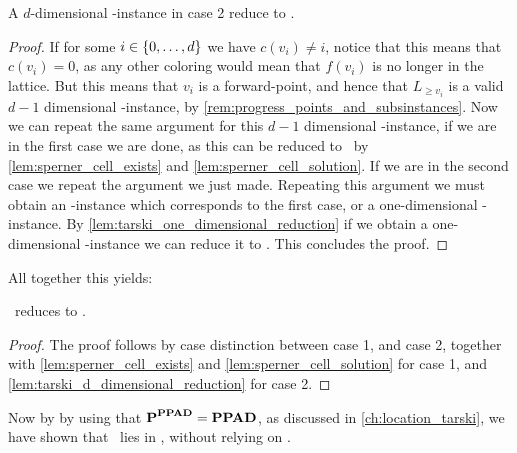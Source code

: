\begin{lemma}\label{lem:tarski_d_dimensional_reduction}
	A $d$-dimensional \Tarskistar-instance in case 2 reduce to \Sperner\@.
\end{lemma}
\begin{proof}
	If for some $i \in \left\{0, \dots, d\right\}$ we have $c(v_i) \neq i$, notice that this means that $c(v_i) = 0$, as any other coloring would mean that $f(v_i)$ is no longer in the lattice. But this means that $v_i$ is a forward-point, and hence that $L_{\geq v_i}$ is a valid $d-1$ dimensional \Tarskistar-instance, by \cref{rem:progress_points_and_subsinstances}. Now we can repeat the same argument for this $d-1$ dimensional \Tarskistar-instance, if we are in the first case we are done, as this can be reduced to \Sperner\ by \cref{lem:sperner_cell_exists} and \cref{lem:sperner_cell_solution}. If we are in the second case we repeat the argument we just made. Repeating this argument we must obtain an \Tarskistar-instance which corresponds to the first case, or a one-dimensional \Tarskistar-instance. By \cref{lem:tarski_one_dimensional_reduction} if we obtain a one-dimensional \Tarskistar-instance we can reduce it to \Sperner. This concludes the proof.
\end{proof}

All together this yields:
\begin{theorem}
	\Tarskistar\ reduces to \Sperner.
\end{theorem}
\begin{proof}
	The proof follows by case distinction between case 1, and case 2, together with \cref{lem:sperner_cell_exists} and \cref{lem:sperner_cell_solution} for case 1, and \cref{lem:tarski_d_dimensional_reduction} for case 2.
\end{proof}

Now by by using that $\textbf{P}^{\textbf{PPAD}} = \textbf{PPAD}$, as discussed in \cref{ch:location_tarski}, we have shown that \Tarski\ lies in \PPAD, without relying on \Brouwer.